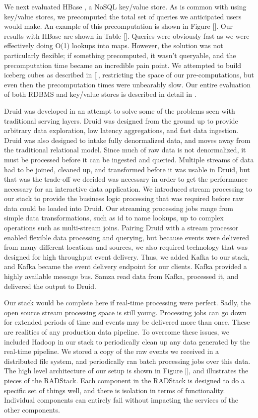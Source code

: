 \documentclass{vldb}
\begin{document}
We next evaluated HBase \cite{george2011hbase}, a NoSQL key/value store. As is common with using
key/value stores, we precomputed the total set of queries we anticipated users
would make. An example of this precomputation is shown in Figure []. Our
results with HBase are shown in Table []. Queries were obviously fast as we
were effectively doing O(1) lookups into maps. However, the solution was not
particularly flexible; if something precomputed, it wasn’t queryable, and the
precomputation time became an incredible pain point. We attempted to build
iceberg cubes as described in [], restricting the space of our
pre-computations, but even then the precomputation times were unbearably slow.
Our entire evaluation of both RDBMS and key/value stores is described in detail
in \cite{tschetter2011druid}.

Druid was developed in an attempt to solve some of the problems seen with
traditional serving layers. Druid was designed from the ground up to provide
arbitrary data exploration, low latency aggregations, and fast data ingestion.
Druid was also designed to intake fully denormalized data, and moves away from
the traditional relational model. Since much of raw data is not denormalized,
it must be processed before it can be ingested and queried. Multiple streams of
data had to be joined, cleaned up, and transformed before it was usable in
Druid, but that was the trade-off we decided was necessary in order to get the
performance necessary for an interactive data application. We introduced stream
processing to our stack to provide the business logic processing that was
required before raw data could be loaded into Druid. Our streaming processing
jobs range from simple data transformations, such as id to name lookups, up to
complex operations such as multi-stream joins. Pairing Druid with a stream
processor enabled flexible data processing and querying, but because events
were delivered from many different locations and sources, we also required
technology that was designed for high throughput event delivery. Thus, we added
Kafka to our stack, and Kafka became the event delivery endpoint for our
clients. Kafka provided a highly available message bus. Samza read data from
Kafka, processed it, and delivered the output to Druid. 

Our stack would be complete here if real-time processing were perfect. Sadly,
the open source stream processing space is still young. Processing jobs can go
down for extended periods of time and events may be delivered more than once.
These are realities of any production data pipeline. To overcome these issues,
we included Hadoop in our stack to periodically clean up any data generated by
the real-time pipeline. We stored a copy of the raw events we received in a
distributed file system, and periodically ran batch processing jobs over this
data. The high level architecture of our setup is shown in Figure [], and
illustrates the pieces of the RADStack. Each component in the RADStack is
designed to do a specific set of things well, and there is isolation in terms
of functionality. Individual components can entirely fail without impacting the
services of the other components.
\end{document}
